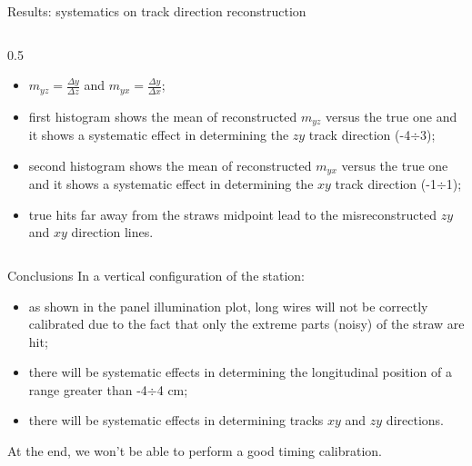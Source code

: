 \documentclass{beamer}[10pt]
\begin{document}
\begin{frame}{Results: systematics on track direction reconstruction}
\begin{columns}
\begin{column}{0.5\framewidth}
      \begin{itemize}
        \item $m_{yz}=\frac{\Delta y}{\Delta z}$ and $m_{yx}=\frac{\Delta y}{\Delta x}$;
        \vspace{2mm}
        \item first histogram shows the mean of reconstructed $m_{yz}$ versus the true one and it shows a systematic effect in determining the $zy$ track direction (-4$\div$3);
        \vspace{2mm}
        \item second histogram shows the mean of reconstructed $m_{yx}$ versus the true one and it shows a systematic effect in determining the $xy$ track direction (-1$\div$1);
        \vspace{2mm}
        \item true hits far away from the straws midpoint lead to the misreconstructed $zy$ and $xy$ direction lines.
      \end{itemize}
    \end{column}
  \end{columns}
\end{frame}
\begin{frame}{Conclusions}
  In a vertical configuration of the station:
  \vspace{4mm}
  \begin{itemize}
    \item as shown in the panel illumination plot, long wires will not be correctly calibrated due to the fact that only the extreme parts (noisy) of the straw are hit;
    \vspace{2mm}
    \item there will be systematic effects in determining the longitudinal position of a range greater than -4$\div$4 cm;
    \vspace{2mm}
    \item there will be systematic effects in determining tracks $xy$ and $zy$ directions.
  \end{itemize}
  \vspace{4mm}
  At the end, we won't be able to perform a good timing calibration.
\end{frame}
\end{document}
